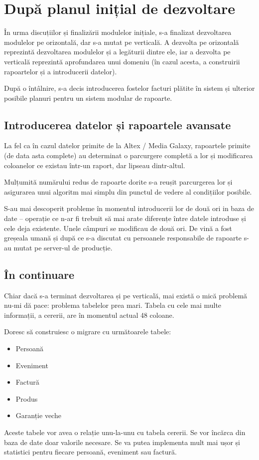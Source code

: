 \section{După planul inițial de dezvoltare}

	În urma discuțiilor și finalizării modulelor inițiale, s-a finalizat dezvoltarea modulelor pe orizontală, dar s-a mutat pe verticală.
	A dezvolta pe orizontală reprezintă dezvoltarea modulelor și a legăturii dintre ele, iar a dezvolta pe verticală reprezintă aprofundarea unui domeniu (în cazul acesta, a construirii rapoartelor și a introducerii datelor).

	După o întâlnire, s-a decis introducerea fostelor facturi plătite în sistem și ulterior posibile planuri pentru un sistem modular de rapoarte.


	\subsection{Introducerea datelor și rapoartele avansate}

	La fel ca în cazul datelor primite de la Altex / Media Galaxy, rapoartele primite (de data asta complete) au determinat o parcurgere completă a lor și modificarea coloanelor ce existau într-un raport, dar lipseau dintr-altul.

	Mulțumită numărului redus de rapoarte dorite s-a reușit parcurgerea lor și asigurarea unui algoritm mai simplu din punctul de vedere al condițiilor posibile.

	S-au mai descoperit probleme în momentul introducerii lor de două ori in baza de date -- operație ce n-ar fi trebuit să mai arate diferențe între datele introduse și cele deja existente.
	Unele câmpuri se modificau de două ori.
	De vină a fost greșeala umană și după ce s-a discutat cu persoanele responsabile de rapoarte s-au mutat pe server-ul de producție.

	\subsection{În continuare}

		Chiar dacă s-a terminat dezvoltarea și pe verticală, mai există o mică problemă nu-mi dă pace: problema tabelelor prea mari.
		Tabela cu cele mai multe informații, a cererii, are în momentul actual 48 coloane.

		Doresc să construiesc o migrare cu următoarele tabele:
		\begin{itemize}
			\item Persoană
			\item Eveniment
			\item Factură
			\item Produs
			\item Garanție veche
		\end{itemize}
		Aceste tabele vor avea o relație unu-la-unu cu tabela cererii.
		Se vor încărca din baza de date doar valorile necesare.
		Se va putea implementa mult mai ușor și statistici pentru fiecare persoană, eveniment sau factură.

